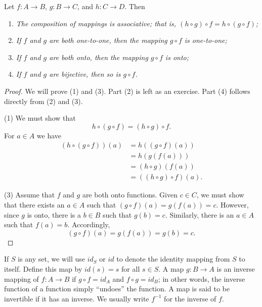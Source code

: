 \begin{theorem}
Let $f : A \rightarrow B$, $g : B \rightarrow C$, and $h : C \rightarrow D$. Then  
\begin{enumerate}
 
\rm\item\it
The composition of mappings is associative; that is, $(h \circ g) \circ f = h \circ (g \circ f)$;  
 
\rm\item\it
If $f$ and $g$ are both one-to-one, then the mapping $g \circ f$ is one-to-one; 
 
\rm\item\it
If $f$ and $g$ are both onto, then the mapping $g \circ f$ is onto;  
 
\rm\item\it
If $f$ and $g$ are bijective, then so is $g \circ f$.
 
\end{enumerate}
\end{theorem}
 
\begin{proof}
We will prove (1) and (3). Part (2) is left as an exercise.  Part (4) follows directly from (2) and (3). 
 
(1) 
We must show that
\[
h \circ (g \circ f) = (h \circ g) \circ f.
\]
For $a \in A$ we have
\begin{align*}
(h \circ (g \circ f))(a) & = h((g \circ f)(a)) \\
& = h(g(f(a)))  \\
& = (h \circ g)(f(a)) \\
& = ((h \circ g) \circ f)(a).
\end{align*}
 
(3) 
Assume that $f$ and $g$ are both onto functions.  Given $c \in C$, we must show that there exists an $a \in A$ such that $(g \circ f)(a) = g(f(a)) = c$.  However, since $g$ is onto, there is a $b \in B$ such that $g(b) = c$.  Similarly, there is an $a \in A$ such that $f(a) = b$.  Accordingly, 
\[
(g \circ f)(a) = g(f(a)) = g(b) = c.
\]
\end{proof}
 
\medskip
 
If $S$ is any set, we will use $id_S$ or $id$\label{noteidentity} to denote the {\bfi identity mapping\/} from $S$ to itself.  Define this map by $id(s) = s$ for all $s \in S$.  A map $g: B \rightarrow A$ is an {\bfi inverse mapping\/} of $f: A \rightarrow B$ if $g \circ f = id_A$ and $f \circ g = id_B$; in other words, the inverse function of a function simply ``undoes'' the function.   A map is said to be {\bfi invertible\/} if it has an inverse.  We usually write $f^{-1}$\label{inversefunc} for the inverse of $f$.  


